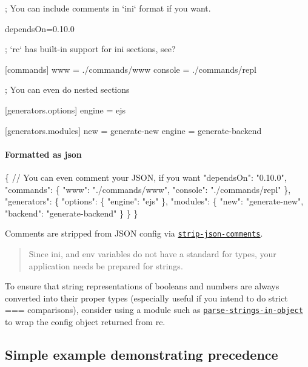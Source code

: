 \begin{DoxyCode}
; You can include comments in `ini` format if you want.

dependsOn=0.10.0


; `rc` has built-in support for ini sections, see?

[commands]
  www     = ./commands/www
  console = ./commands/repl


; You can even do nested sections

[generators.options]
  engine  = ejs

[generators.modules]
  new     = generate-new
  engine  = generate-backend
\end{DoxyCode}


\paragraph*{Formatted as {\ttfamily json}}


\begin{DoxyCode}
\{
  // You can even comment your JSON, if you want
  "dependsOn": "0.10.0",
  "commands": \{
    "www": "./commands/www",
    "console": "./commands/repl"
  \},
  "generators": \{
    "options": \{
      "engine": "ejs"
    \},
    "modules": \{
      "new": "generate-new",
      "backend": "generate-backend"
    \}
  \}
\}
\end{DoxyCode}


Comments are stripped from J\+S\+ON config via \href{https://github.com/sindresorhus/strip-json-comments}{\tt strip-\/json-\/comments}.

\begin{quote}
Since ini, and env variables do not have a standard for types, your application needs be prepared for strings. \end{quote}


To ensure that string representations of booleans and numbers are always converted into their proper types (especially useful if you intend to do strict {\ttfamily ===} comparisons), consider using a module such as \href{https://github.com/anselanza/parse-strings-in-object}{\tt parse-\/strings-\/in-\/object} to wrap the config object returned from rc.

\subsection*{Simple example demonstrating precedence}

